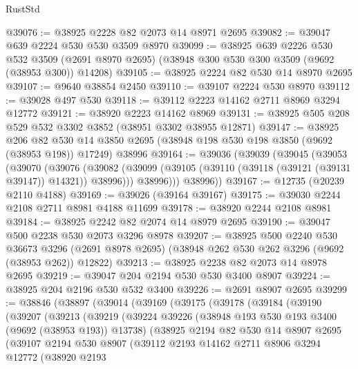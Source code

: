 \begin{lexlean}{RustStd}
\begin{coremodule}
@39076 := @38925 @2228 @82 @2073 @14 @8971 @2695
@39082 := @39047 @639 @2224 @530 @530 @3509 @8970
@39099 := @38925
    @639
    @2226
    @530
    @532
    @3509
    (@2691 @8970 @2695)
    (@38948 @300 @530 @300 @3509 (@9692 (@38953 @300)) @14208)
@39105 := @38925 @2224 @82 @530 @14 @8970 @2695
@39107 := @9640 @38854 @2450
@39110 := @39107 @2224 @530 @8970
@39112 := @39028 @497 @530
@39118 := @39112 @2223 @14162 @2711 @8969 @3294 @12772
@39121 := @38920 @2223 @14162 @8969
@39131 := @38925 @505 @208 @529 @532 @3302 @3852 (@38951 @3302 @38955 @12871)
@39147 := @38925
    @206
    @82
    @530
    @14
    @3850
    @2695
    (@38948 @198 @530 @198 @3850 (@9692 (@38953 @198)) @17249)
    @38996
@39164 := @39036
    (@39039
      (@39045
        (@39053
          (@39070
            (@39076
              (@39082 (@39099 (@39105 (@39110 (@39118 (@39121 (@39131 @39147)) @14321)) @38996)))
              @38996)))
        @38996))
@39167 := @12735 (@20239 @2110 @4188)
@39169 := @39026 (@39164 @39167)
@39175 := @39030 @2244 @2108 @2711 @8981 @4188 @11699
@39178 := @38920 @2244 @2108 @8981
@39184 := @38925 @2242 @82 @2074 @14 @8979 @2695
@39190 := @39047 @500 @2238 @530 @2073 @3296 @8978
@39207 := @38925
    @500
    @2240
    @530
    @36673
    @3296
    (@2691 @8978 @2695)
    (@38948 @262 @530 @262 @3296 (@9692 (@38953 @262)) @12822)
@39213 := @38925 @2238 @82 @2073 @14 @8978 @2695
@39219 := @39047 @204 @2194 @530 @530 @3400 @8907
@39224 := @38925 @204 @2196 @530 @532 @3400
@39226 := @2691 @8907 @2695
@39299 := @38846
    (@38897
      (@39014
        (@39169
          (@39175
            (@39178
              (@39184
                (@39190
                  (@39207
                    (@39213
                      (@39219
                        (@39224
                          @39226
                          (@38948 @193 @530 @193 @3400 (@9692 (@38953 @193)) @13738)
                          (@38925
                            @2194
                            @82
                            @530
                            @14
                            @8907
                            @2695
                            (@39107
                              @2194
                              @530
                              @8907
                              (@39112
                                @2193
                                @14162
                                @2711
                                @8906
                                @3294
                                @12772
                                (@38920
                                  @2193

\end{coremodule}
\end{lexlean}
